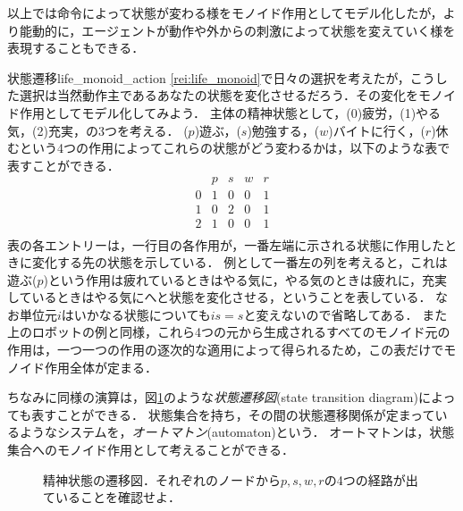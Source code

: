 \documentclass[11pt,a4paper, dvipdfmx]{jsarticle}
\begin{document}
以上では命令によって状態が変わる様をモノイド作用としてモデル化したが，より能動的に，エージェントが動作や外からの刺激によって状態を変えていく様を表現することもできる．

\begin{rei}{状態遷移}{life_monoid_action}
    \ref{rei:life_monoid}で日々の選択を考えたが，こうした選択は当然動作主であるあなたの状態を変化させるだろう．その変化をモノイド作用としてモデル化してみよう．
    主体の精神状態として，(0)疲労，(1)やる気，(2)充実，の3つを考える．
    ($p$)遊ぶ，($s$)勉強する，($w$)バイトに行く，($r$)休むという4つの作用によってこれらの状態がどう変わるかは，以下のような表で表すことができる．
    \[
        \begin{array}{c|cccc}
               & p & s & w & r \\ \hline
             0 & 1 & 0 & 0 & 1 \\
             1 & 0 & 2 & 0 & 1 \\ 
             2 & 1 & 0 & 0 & 1 \\
        \end{array}
    \]
    表の各エントリーは，一行目の各作用が，一番左端に示される状態に作用したときに変化する先の状態を示している．
    例として一番左の列を考えると，これは遊ぶ($p$)という作用は疲れているときはやる気に，やる気のときは疲れに，充実しているときはやる気にへと状態を変化させる，ということを表している．
    なお単位元$i$はいかなる状態についても$is = s$と変えないので省略してある．
    また上のロボットの例と同様，これら4つの元から生成されるすべてのモノイド元の作用は，一つ一つの作用の逐次的な適用によって得られるため，この表だけでモノイド作用全体が定まる．
\end{rei}

ちなみに同様の演算は，図\ref{life_state}のような\emph{状態遷移図}(state transition diagram)によっても表すことができる．
状態集合を持ち，その間の状態遷移関係が定まっているようなシステムを，\emph{オートマトン}(automaton)という．
オートマトンは，状態集合へのモノイド作用として考えることができる．

\begin{figure}[t]
    \begin{center}
      \end{center}
      \caption{精神状態の遷移図．それぞれのノードから$p,s,w,r$の4つの経路が出ていることを確認せよ．}
      \label{life_state}
\end{figure}
\end{document}
